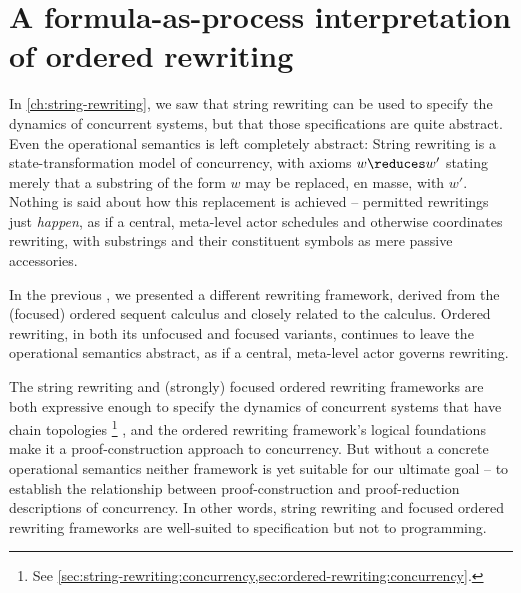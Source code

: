 \chapter{A formula-as-process interpretation of ordered rewriting}\label{ch:formula-as-process}\label{ch:choreographies}



In \cref{ch:string-rewriting}, we saw that string rewriting can be used to specify the dynamics of concurrent systems, but that those specifications are quite abstract.
Even the operational semantics is left completely abstract:
String rewriting is a state-transformation model of concurrency, with axioms $w \reduces w'$
stating merely that a substring of the form $w$ may be replaced, en masse, with $w'$.
Nothing is said about how this replacement is achieved -- permitted rewritings just \emph{happen}, as if a central, meta-level actor schedules and otherwise coordinates rewriting, with substrings and their constituent symbols as mere passive accessories.

In the previous , we presented a different rewriting framework, derived from the (focused) ordered sequent calculus and closely related to the \citeauthor{Lambek:AMM58} calculus\autocite{Lambek:AMM58}.
Ordered rewriting, in both its unfocused and focused variants, continues to leave the operational semantics abstract, as if a central, meta-level actor governs rewriting.

The string rewriting and (strongly) focused ordered rewriting frameworks are both expressive enough to specify the dynamics of concurrent systems that have chain topologies%
\footnote{See \cref{sec:string-rewriting:concurrency,sec:ordered-rewriting:concurrency}.}%
, and the ordered rewriting framework's logical foundations make it a proof-construction approach to concurrency.
But without a concrete operational semantics neither framework is yet suitable for our ultimate goal -- 
to establish the relationship between proof-construction and proof-reduction descriptions of concurrency.
In other words, string rewriting and focused ordered rewriting frameworks are well-suited to specification but not to programming.

